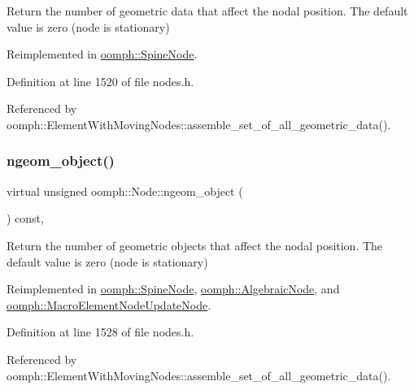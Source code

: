 Return the number of geometric data that affect the nodal position. The default value is zero (node is stationary) 



Reimplemented in \hyperlink{classoomph_1_1SpineNode_a46735b4f430014997c525134c0889b4d}{oomph\+::\+Spine\+Node}.



Definition at line 1520 of file nodes.\+h.



Referenced by oomph\+::\+Element\+With\+Moving\+Nodes\+::assemble\+\_\+set\+\_\+of\+\_\+all\+\_\+geometric\+\_\+data().

\mbox{\label{classoomph_1_1Node_a2c0fb79493f94d2ce19736737ebf5447}} 
\subsubsection{\texorpdfstring{ngeom\+\_\+object()}{ngeom\_object()}}
{\footnotesize\ttfamily virtual unsigned oomph\+::\+Node\+::ngeom\+\_\+object (\begin{DoxyParamCaption}{ }\end{DoxyParamCaption}) const\hspace{0.3cm}{\ttfamily [inline]}, {\ttfamily [virtual]}}



Return the number of geometric objects that affect the nodal position. The default value is zero (node is stationary) 



Reimplemented in \hyperlink{classoomph_1_1SpineNode_afba3d62d2da3b8fa6421958fda3f0a14}{oomph\+::\+Spine\+Node}, \hyperlink{classoomph_1_1AlgebraicNode_a10f49849e0942e68c6791810ffc6fb31}{oomph\+::\+Algebraic\+Node}, and \hyperlink{classoomph_1_1MacroElementNodeUpdateNode_abf17a352b005d110874c1f4fe715faeb}{oomph\+::\+Macro\+Element\+Node\+Update\+Node}.



Definition at line 1528 of file nodes.\+h.



Referenced by oomph\+::\+Element\+With\+Moving\+Nodes\+::assemble\+\_\+set\+\_\+of\+\_\+all\+\_\+geometric\+\_\+data().

\mbox{\label{classoomph_1_1Node_aecf8c979266300d3609de2b4ddfa3cc8}} 
